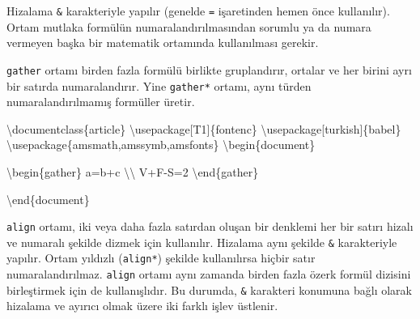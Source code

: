 \documentclass[
  letterpaper,
  DIV=11,
  numbers=noendperiod]{scrreprt}
\newenvironment{Shaded}{\begin{snugshade}}{\end{snugshade}}
\newcommand{\BuiltInTok}[1]{\textcolor[rgb]{0.00,0.23,0.31}{#1}}
\newcommand{\ExtensionTok}[1]{\textcolor[rgb]{0.00,0.23,0.31}{#1}}
\newcommand{\KeywordTok}[1]{\textcolor[rgb]{0.00,0.23,0.31}{#1}}
\newcommand{\NormalTok}[1]{\textcolor[rgb]{0.00,0.23,0.31}{#1}}
\newcommand{\SpecialCharTok}[1]{\textcolor[rgb]{0.37,0.37,0.37}{#1}}
\newcommand{\SpecialStringTok}[1]{\textcolor[rgb]{0.13,0.47,0.30}{#1}}
\begin{document}
Hizalama \texttt{\&} karakteriyle yapılır (genelde \texttt{=}
işaretinden hemen önce kullanılır). Ortam mutlaka formülün
numaralandırılmasından sorumlu ya da numara vermeyen başka bir matematik
ortamında kullanılması gerekir.

\texttt{gather} ortamı birden fazla formülü birlikte gruplandırır,
ortalar ve her birini ayrı bir satırda numaralandırır. Yine
\texttt{gather*} ortamı, aynı türden numaralandırılmamış formüller
üretir.

\begin{Shaded}
\begin{Highlighting}[]
\BuiltInTok{\textbackslash{}documentclass}\NormalTok{\{}\ExtensionTok{article}\NormalTok{\}}
\BuiltInTok{\textbackslash{}usepackage}\NormalTok{[T1]\{}\ExtensionTok{fontenc}\NormalTok{\}}
\BuiltInTok{\textbackslash{}usepackage}\NormalTok{[turkish]\{}\ExtensionTok{babel}\NormalTok{\}}
\BuiltInTok{\textbackslash{}usepackage}\NormalTok{\{}\ExtensionTok{amsmath,amssymb,amsfonts}\NormalTok{\}}
\KeywordTok{\textbackslash{}begin}\NormalTok{\{}\ExtensionTok{document}\NormalTok{\}}

\KeywordTok{\textbackslash{}begin}\NormalTok{\{}\ExtensionTok{gather}\NormalTok{\}}
\SpecialStringTok{a=b+c }\SpecialCharTok{\textbackslash{}\textbackslash{}}
\SpecialStringTok{V+F{-}S=2}
\KeywordTok{\textbackslash{}end}\NormalTok{\{}\ExtensionTok{gather}\NormalTok{\}}

\KeywordTok{\textbackslash{}end}\NormalTok{\{}\ExtensionTok{document}\NormalTok{\}}
\end{Highlighting}
\end{Shaded}

\texttt{align} ortamı, iki veya daha fazla satırdan oluşan bir denklemi
her bir satırı hizalı ve numaralı şekilde dizmek için kullanılır.
Hizalama aynı şekilde \texttt{\&} karakteriyle yapılır. Ortam yıldızlı
(\texttt{align*}) şekilde kullanılırsa hiçbir satır numaralandırılmaz.
\texttt{align} ortamı aynı zamanda birden fazla özerk formül dizisini
birleştirmek için de kullanışlıdır. Bu durumda, \texttt{\&} karakteri
konumuna bağlı olarak hizalama ve ayırıcı olmak üzere iki farklı işlev
üstlenir.
\end{document}
